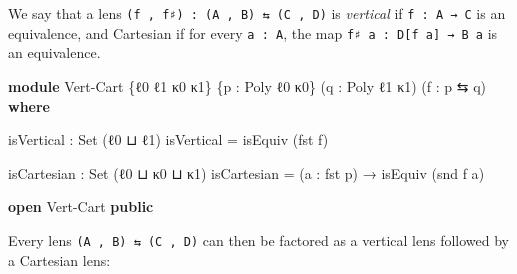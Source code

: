 \documentclass[
  11pt,
  oneside,
  article]{memoir}
\newenvironment{Shaded}{}{}
\newcommand{\DataTypeTok}[1]{\textcolor[rgb]{0.56,0.13,0.00}{#1}}
\newcommand{\KeywordTok}[1]{\textcolor[rgb]{0.00,0.44,0.13}{\textbf{#1}}}
\newcommand{\NormalTok}[1]{#1}
\newcommand{\OtherTok}[1]{\textcolor[rgb]{0.00,0.44,0.13}{#1}}
\theoremstyle{definition}
\theoremstyle{plain}
\newcommand{\0}{\textsf{0}}
\newcommand{\1}{\tn{\textsf{1}}}
\begin{document}
We say that a lens \texttt{(f\ ,\ f♯)\ :\ (A\ ,\ B)\ ⇆\ (C\ ,\ D)} is
\emph{vertical} if \texttt{f\ :\ A\ →\ C} is an equivalence, and
Cartesian if for every \texttt{a\ :\ A}, the map
\texttt{f♯\ a\ :\ D{[}f\ a{]}\ →\ B\ a} is an equivalence.

\begin{Shaded}
\begin{Highlighting}[]
\KeywordTok{module}\NormalTok{ Vert{-}Cart }\OtherTok{\{}\NormalTok{ℓ0 ℓ1 κ0 κ1}\OtherTok{\}} \OtherTok{\{}\NormalTok{p }\OtherTok{:}\NormalTok{ Poly ℓ0 κ0}\OtherTok{\}} 
                 \OtherTok{(}\NormalTok{q }\OtherTok{:}\NormalTok{ Poly ℓ1 κ1}\OtherTok{)} \OtherTok{(}\NormalTok{f }\OtherTok{:}\NormalTok{ p ⇆ q}\OtherTok{)} \KeywordTok{where}

\NormalTok{    isVertical }\OtherTok{:} \DataTypeTok{Set} \OtherTok{(}\NormalTok{ℓ0 ⊔ ℓ1}\OtherTok{)}
\NormalTok{    isVertical }\OtherTok{=}\NormalTok{ isEquiv }\OtherTok{(}\NormalTok{fst f}\OtherTok{)}

\NormalTok{    isCartesian }\OtherTok{:} \DataTypeTok{Set} \OtherTok{(}\NormalTok{ℓ0 ⊔ κ0 ⊔ κ1}\OtherTok{)}
\NormalTok{    isCartesian }\OtherTok{=} \OtherTok{(}\NormalTok{a }\OtherTok{:}\NormalTok{ fst p}\OtherTok{)} \OtherTok{→}\NormalTok{ isEquiv }\OtherTok{(}\NormalTok{snd f a}\OtherTok{)}

\KeywordTok{open}\NormalTok{ Vert{-}Cart }\KeywordTok{public}
\end{Highlighting}
\end{Shaded}

Every lens \texttt{(A\ ,\ B)\ ⇆\ (C\ ,\ D)} can then be factored as a
vertical lens followed by a Cartesian lens:
\end{document}
